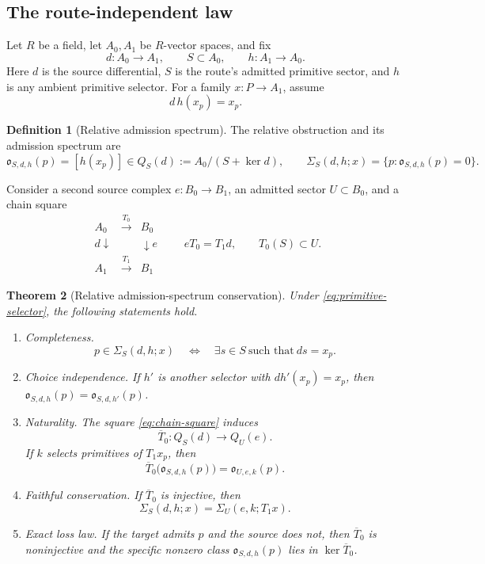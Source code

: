 \documentclass[11pt]{article}
\newtheorem{theorem}{Theorem}[section]
\theoremstyle{definition}
\newtheorem{definition}[theorem]{Definition}
\theoremstyle{remark}
\begin{document}
\subsection{The route-independent law}

Let \(R\) be a field, let \(A_0,A_1\) be \(R\)-vector spaces, and fix
\[
 d:A_0\longrightarrow A_1,\qquad S\subset A_0,\qquad
 h:A_1\longrightarrow A_0.
\]
Here \(d\) is the source differential, \(S\) is the route's admitted
primitive sector, and \(h\) is any ambient primitive selector.  For a
family \(x:P\to A_1\), assume
\[
                           d\,h(x_p)=x_p.
\tag{5.A}\label{eq:primitive-selector}
\]

\begin{definition}[Relative admission spectrum]
The relative obstruction and its admission spectrum are
\[
 \mathfrak o_{S,d,h}(p)=[h(x_p)]
       \in Q_S(d):=A_0/(S+\ker d),
 \qquad
 \Sigma_S(d,h;x)=\{p:\mathfrak o_{S,d,h}(p)=0\}.
\tag{5.B}\label{eq:admission-spectrum}
\]
\end{definition}

Consider a second source complex \(e:B_0\to B_1\), an admitted sector
\(U\subset B_0\), and a chain square
\[
\begin{array}{ccc}
A_0&\xrightarrow{T_0}&B_0\\
{\scriptstyle d}\downarrow&&\downarrow{\scriptstyle e}\\
A_1&\xrightarrow{T_1}&B_1
\end{array}
\qquad
eT_0=T_1d,\qquad T_0(S)\subset U.
\tag{5.C}\label{eq:chain-square}
\]
\begin{theorem}[Relative admission-spectrum conservation]
\label{thm:main}
Under \eqref{eq:primitive-selector}, the following statements hold.
\begin{enumerate}[label=\textup{(\roman*)},leftmargin=2.2em]
\item \emph{Completeness.}
\[
 p\in\Sigma_S(d,h;x)
 \quad\Longleftrightarrow\quad
 \exists s\in S\ \text{such that}\ ds=x_p.
\tag{5.D}\label{eq:spectrum-completeness}
\]
\item \emph{Choice independence.}  If \(h'\) is another selector with
      \(dh'(x_p)=x_p\), then
      \(\mathfrak o_{S,d,h}(p)=\mathfrak o_{S,d,h'}(p)\).
\item \emph{Naturality.}  The square \eqref{eq:chain-square} induces
      \[
       \overline T_0:Q_S(d)\longrightarrow Q_U(e).
      \]
      If \(k\) selects primitives of \(T_1x_p\), then
      \[
       \overline T_0\bigl(\mathfrak o_{S,d,h}(p)\bigr)
        =\mathfrak o_{U,e,k}(p).
      \tag{5.E}\label{eq:obstruction-naturality}
      \]
\item \emph{Faithful conservation.}  If \(\overline T_0\) is injective,
      then
      \[
                    \Sigma_S(d,h;x)=\Sigma_U(e,k;T_1x).
      \tag{5.F}\label{eq:spectrum-conservation}
      \]
\item \emph{Exact loss law.}  If the target admits \(p\) and the source
      does not, then \(\overline T_0\) is noninjective and the specific
      nonzero class \(\mathfrak o_{S,d,h}(p)\) lies in
      \(\ker\overline T_0\).
\end{enumerate}
\end{theorem}
\end{document}
